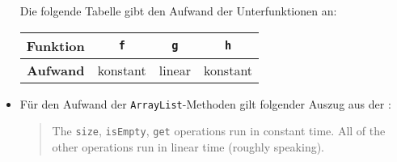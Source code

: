 \documentclass[german, solution]{acAssignment}
\begin{document}
\begin{itemize}[itemsep=0.4cm]
        Die folgende Tabelle gibt den Aufwand der Unterfunktionen an:
        \begin{center}
            \begin{tabular}{cccc}
                \toprule
                \textbf{Funktion} & \texttt{f} & \texttt{g} & \texttt{h} \\
                \midrule
                \textbf{Aufwand} & konstant & linear & konstant \\
                \bottomrule
            \end{tabular}
        \end{center}
    
    \clearpage
    \item
        \begin{myAlgTable}{4}
            \myAlgTableRow{}{\ \ \ \ \}}
            \myAlgTableRow{}{\ \ \}}
            \myAlgTableRow{}{\}}
        \end{myAlgTable}
        
        Für den Aufwand der \texttt{ArrayList}-Methoden gilt folgender Auszug aus
        der :
        \begin{quote}
            The \texttt{size}, \texttt{isEmpty}, \texttt{get} \textelp{} operations run in constant time.
            \textelp{} All of the other operations run in linear time (roughly speaking).
        \end{quote}
    

\end{itemize}
\end{document}
